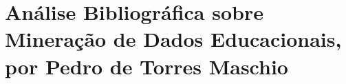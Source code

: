 \chapter{Análise Bibliográfica sobre Mineração de Dados Educacionais, por Pedro de Torres Maschio\label{chap:bibliometria:pedro-maschio}}